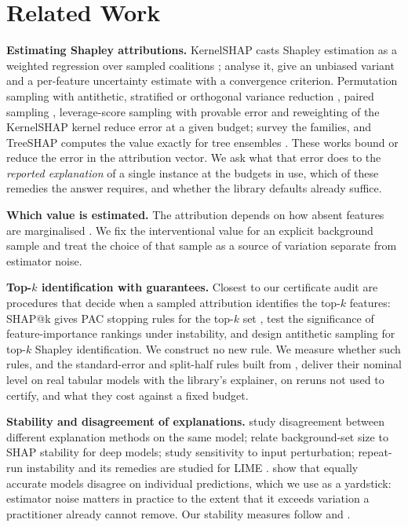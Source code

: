\section{Related Work}
\label{sec:related}

\textbf{Estimating Shapley attributions.}
KernelSHAP casts Shapley estimation as a weighted regression over sampled coalitions \citep{lundberg2017unified}; \citet{covert2021improving} analyse it, give an unbiased variant and a per-feature uncertainty estimate with a convergence criterion. Permutation sampling with antithetic, stratified or orthogonal variance reduction \citep{mitchell2022sampling}, paired sampling \citep{mayer2025paired}, leverage-score sampling with provable error \citep{musco2024leverage} and reweighting of the KernelSHAP kernel \citep{olsen2025weighting} reduce error at a given budget; \citet{chen2023algorithms} survey the families, and TreeSHAP computes the value exactly for tree ensembles \citep{lundberg2020trees}. These works bound or reduce the error in the attribution vector. We ask what that error does to the \emph{reported explanation} of a single instance at the budgets in use, which of these remedies the answer requires, and whether the library defaults already suffice.

\textbf{Which value is estimated.}
The attribution depends on how absent features are marginalised \citep{sundararajan2019many,kumar2020problems,chen2020true}. We fix the interventional value for an explicit background sample and treat the choice of that sample as a source of variation separate from estimator noise.

\textbf{Top-$k$ identification with guarantees.}
Closest to our certificate audit are procedures that decide when a sampled attribution identifies the top-$k$ features: SHAP@k gives PAC stopping rules for the top-$k$ set \citep{kariyappa2024shapk}, \citet{goldwasser2024significance} test the significance of feature-importance rankings under instability, and \citet{kolpaczki2025antithetic} design antithetic sampling for top-$k$ Shapley identification. We construct no new rule. We measure whether such rules, and the standard-error and split-half rules built from \citet{covert2021improving}, deliver their nominal level on real tabular models with the library's explainer, on reruns not used to certify, and what they cost against a fixed budget.

\textbf{Stability and disagreement of explanations.}
\citet{krishna2022disagreement} study disagreement between different explanation methods on the same model; \citet{yuan2022background} relate background-set size to SHAP stability for deep models; \citet{alvarezmelis2018robustness} study sensitivity to input perturbation; repeat-run instability and its remedies are studied for LIME \citep{zhang2019trust,visani2020optilime,zhou2021slime}. \citet{marx2019multiplicity} show that equally accurate models disagree on individual predictions, which we use as a yardstick: estimator noise matters in practice to the extent that it exceeds variation a practitioner already cannot remove. Our stability measures follow \citet{nogueira2018stability} and \citet{webber2010rbo}.

